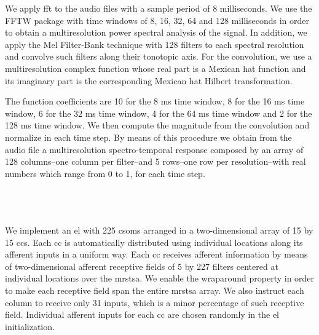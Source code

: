 \documentclass[10pt,letterpaper]{article}
\begin{document}
We apply \gls{fft} to the audio files with a sample period of 8 milliseconds.
We use the FFTW package \cite{FFTW05, fftw}
with time windows of 8, 16, 32, 64 and 128 milliseconds in order to obtain
a multiresolution power spectral analysis of the signal.
In addition, we apply the Mel Filter-Bank technique with 128 filters to each
spectral resolution and convolve such filters along their tonotopic axis.
For the convolution, we use a multiresolution complex function whose real part
is a Mexican hat function and its imaginary part is the corresponding Mexican hat Hilbert transformation.


The function coefficients are 10 for the 8 ms time window, 8 for the 16 ms time window, 6 for the 32 ms time window, 4 for the 64 ms time window
and 2 for the 128 ms time window. We then compute the magnitude from the convolution and normalize in each time step.
By means of this procedure we obtain from the audio file a multiresolution spectro-temporal response composed by
an array of 128 columns--one column per filter--and 5 rows--one row per resolution--with real numbers which range from
0 to 1, for each time step.









~\\
~\\
~\\

We implement an \gls{el} with 225 \glspl{csom} arranged in a two-dimensional
array of 15 by 15 \glspl{cc}. Each \gls{cc} is automatically distributed using individual locations along its afferent inputs in a uniform way.
Each \gls{cc} receives afferent information by means of
two-dimensional afferent receptive fields of 5 by 227 filters centered at individual locations over the \gls{mrstsa}.
We enable the wraparound property in order to make each receptive field span the entire
\gls{mrstsa} array.
We also instruct each column to receive only 31 inputs, which is a minor percentage of such
receptive field.
Individual afferent inputs for each \gls{cc} are chosen randomly in the \gls{el} initialization. 
\end{document}
